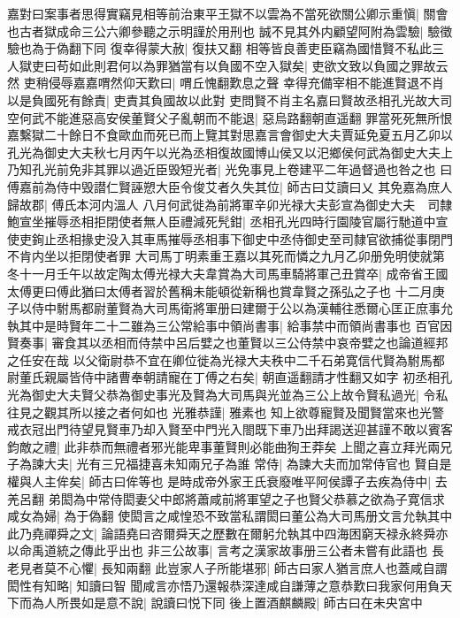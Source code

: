 嘉對曰案事者思得實竊見相等前治東平王獄不以雲為不當死欲關公卿示重愼|{
	關會也古者獄成命三公六卿參聽之示明謹於用刑也}
誠不見其外内顧望阿附為雲驗|{
	驗徵驗也為于偽翻下同}
復幸得蒙大赦|{
	復扶又翻}
相等皆良善吏臣竊為國惜賢不私此三人獄吏曰苟如此則君何以為罪猶當有以負國不空入獄矣|{
	吏欲文致以負國之罪故云然}
吏稍侵辱嘉嘉喟然仰天歎曰|{
	喟丘愧翻歎息之聲}
幸得充備宰相不能進賢退不肖以是負國死有餘責|{
	吏責其負國故以此對}
吏問賢不肖主名嘉曰賢故丞相孔光故大司空何武不能進惡高安侯董賢父子亂朝而不能退|{
	惡烏路翻朝直遥翻}
罪當死死無所恨嘉繫獄二十餘日不食歐血而死已而上覽其對思嘉言會御史大夫賈延免夏五月乙卯以孔光為御史大夫秋七月丙午以光為丞相復故國博山侯又以汜鄉侯何武為御史大夫上乃知孔光前免非其罪以過近臣毁短光者|{
	光免事見上卷建平二年過督過也咎之也}
曰傅嘉前為侍中毁譛仁賢誣愬大臣令俊艾者久失其位|{
	師古曰艾讀曰乂}
其免嘉為庶人歸故郡|{
	傅氏本河内溫人}
八月何武徙為前將軍辛卯光禄大夫彭宣為御史大夫　司隸鮑宣坐摧辱丞相拒閉使者無人臣禮減死髠鉗|{
	丞相孔光四時行園陵官屬行馳道中宣使吏銁止丞相掾史没入其車馬摧辱丞相事下御史中丞侍御史至司隸官欲捕從事閉門不肯内坐以拒閉使者罪}
大司馬丁明素重王嘉以其死而憐之九月乙卯册免明使就第　冬十一月壬午以故定陶太傅光禄大夫韋賞為大司馬車騎將軍己丑賞卒|{
	成帝省王國太傅更曰傅此猶曰太傅者習於舊稱未能頓從新稱也賞韋賢之孫弘之子也}
十二月庚子以侍中駙馬都尉董賢為大司馬衛將軍册曰建爾于公以為漢輔往悉爾心匡正庶事允執其中是時賢年二十二雖為三公常給事中領尚書事|{
	給事禁中而領尚書事也}
百官因賢奏事|{
	審食其以丞相而侍禁中呂后嬖之也董賢以三公侍禁中哀帝嬖之也論道經邦之任安在哉}
以父衛尉恭不宜在卿位徙為光禄大夫秩中二千石弟寛信代賢為駙馬都尉董氏親屬皆侍中諸曹奉朝請寵在丁傅之右矣|{
	朝直遥翻請才性翻又如字}
初丞相孔光為御史大夫賢父恭為御史事光及賢為大司馬與光並為三公上故令賢私過光|{
	令私往見之觀其所以接之者何如也}
光雅恭謹|{
	雅素也}
知上欲尊寵賢及聞賢當來也光警戒衣冠出門待望見賢車乃却入賢至中門光入閤既下車乃出拜謁送迎甚謹不敢以賓客鈞敵之禮|{
	此非恭而無禮者邪光能卑事董賢則必能曲狥王莽矣}
上聞之喜立拜光兩兄子為諫大夫|{
	光有三兄福捷喜未知兩兄子為誰}
常侍|{
	為諫大夫而加常侍官也}
賢自是權與人主侔矣|{
	師古曰侔等也}
是時成帝外家王氏衰廢唯平阿侯譚子去疾為侍中|{
	去羌呂翻}
弟閎為中常侍閎妻父中郎將蕭咸前將軍望之子也賢父恭慕之欲為子寛信求咸女為婦|{
	為于偽翻}
使閎言之咸惶恐不致當私謂閎曰董公為大司馬册文言允執其中此乃堯禪舜之文|{
	論語堯曰咨爾舜天之歷數在爾躬允執其中四海困窮天禄永終舜亦以命禹道統之傳此乎出也}
非三公故事|{
	言考之漢家故事册三公者未嘗有此語也}
長老見者莫不心懼|{
	長知兩翻}
此豈家人子所能堪邪|{
	師古曰家人猶言庶人也蓋咸自謂}
閎性有知略|{
	知讀曰智}
聞咸言亦悟乃還報恭深達咸自謙薄之意恭歎曰我家何用負天下而為人所畏如是意不說|{
	說讀曰悦下同}
後上置酒麒麟殿|{
	師古曰在未央宮中}

